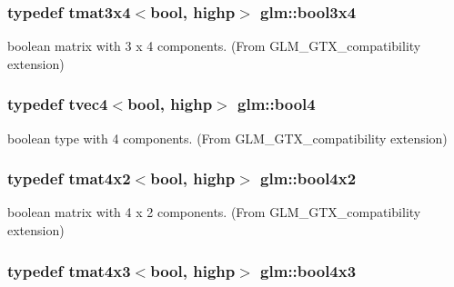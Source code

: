 \subsubsection[{bool3x4}]{\setlength{\rightskip}{0pt plus 5cm}typedef tmat3x4$<$bool, highp$>$ {\bf glm\+::bool3x4}}\label{group__gtx__compatibility_gaf3777caf1e50112919be2939be05ae7e}


boolean matrix with 3 x 4 components. (From G\+L\+M\+\_\+\+G\+T\+X\+\_\+compatibility extension) 

\hypertarget{group__gtx__compatibility_ga141861edebf999f94938944f0fb0777a}{}
\subsubsection[{bool4}]{\setlength{\rightskip}{0pt plus 5cm}typedef tvec4$<$bool, highp$>$ {\bf glm\+::bool4}}\label{group__gtx__compatibility_ga141861edebf999f94938944f0fb0777a}


boolean type with 4 components. (From G\+L\+M\+\_\+\+G\+T\+X\+\_\+compatibility extension) 

\hypertarget{group__gtx__compatibility_ga2d956a9ea3d4c8e8ec12797c9d7cb677}{}
\subsubsection[{bool4x2}]{\setlength{\rightskip}{0pt plus 5cm}typedef tmat4x2$<$bool, highp$>$ {\bf glm\+::bool4x2}}\label{group__gtx__compatibility_ga2d956a9ea3d4c8e8ec12797c9d7cb677}


boolean matrix with 4 x 2 components. (From G\+L\+M\+\_\+\+G\+T\+X\+\_\+compatibility extension) 

\hypertarget{group__gtx__compatibility_gafd85fa864c89a6b1b4887d2790132c5c}{}
\subsubsection[{bool4x3}]{\setlength{\rightskip}{0pt plus 5cm}typedef tmat4x3$<$bool, highp$>$ {\bf glm\+::bool4x3}}\label{group__gtx__compatibility_gafd85fa864c89a6b1b4887d2790132c5c}


